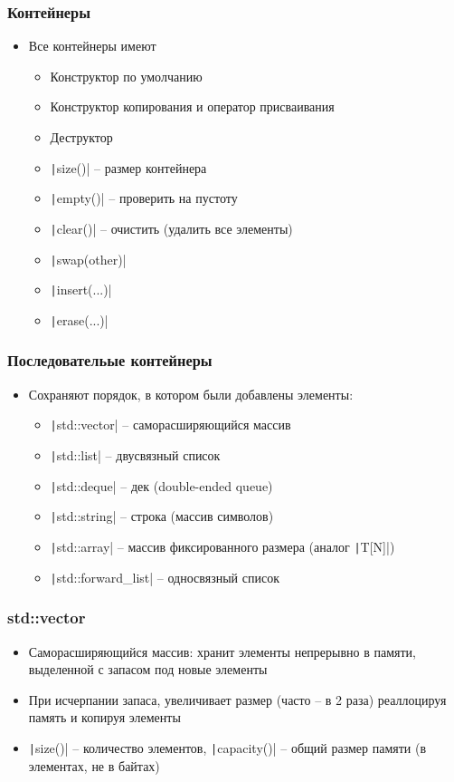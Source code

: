 \documentclass[10pt]{beamer}
\begin{document}
\begin{frame}[fragile]
\frametitle{Контейнеры}
\begin{itemize}
\item Все контейнеры имеют
\pause
\begin{itemize}
\item Конструктор по умолчанию
\pause
\item Конструктор копирования и оператор присваивания
\pause
\item Деструктор
\pause
\item \texttt|size()| -- размер контейнера
\pause
\item \texttt|empty()| -- проверить на пустоту
\pause
\item \texttt|clear()| -- очистить (удалить все элементы)
\pause
\item \texttt|swap(other)|
\pause
\item \texttt|insert(...)|
\pause
\item \texttt|erase(...)|
\end{itemize}
\end{itemize}
\end{frame}

\begin{frame}[fragile]
\frametitle{Последовательые контейнеры}
\begin{itemize}
\item Сохраняют порядок, в котором были добавлены элементы:
\pause
\begin{itemize}
\item \texttt|std::vector| -- саморасширяющийся массив
\pause
\item \texttt|std::list| -- двусвязный список
\pause
\item \texttt|std::deque| -- дек (double-ended queue)
\pause
\item \texttt|std::string| -- строка (массив символов)
\pause
\item \texttt|std::array| -- массив фиксированного размера (аналог \texttt|T[N]|)
\pause
\item \texttt|std::forward_list| -- односвязный список
\end{itemize}
\end{itemize}
\end{frame}

\begin{frame}[fragile]
\frametitle{std::vector}
\begin{itemize}
\item Саморасширяющийся массив: хранит элементы непрерывно в памяти, выделенной с запасом под новые элементы
\pause
\item При исчерпании запаса, увеличивает размер (часто -- в 2 раза) реаллоцируя память и копируя элементы
\pause
\item \texttt|size()| -- количество элементов, \texttt|capacity()| -- общий размер памяти (в элементах, не в байтах)
\end{itemize}
\end{frame}
\end{document}
